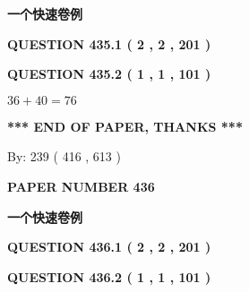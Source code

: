 \documentclass{ctexart}
\begin{document}
   
   
   
 \vspace{0.2in}
{\LARGE {\textbf{ 一个快速卷例}}}
   
   
  
\vspace{0.2in}
  
{\textbf{\Large{QUESTION
435.1 
 ( 2 , 2 , 201 )
}}}
  
  
  
\vspace{0.2in}
  
{\textbf{\Large{QUESTION
435.2 
 ( 1 , 1 , 101 )
}}}
  
  
 
 

$ %
36 +  %
40=   %
76$
 
 
   
   
 \vspace{0.2in}
 
   
   
   
   
\vspace{1.0in} 
{\textbf{\large{ *** END OF PAPER, THANKS *** }}} 
   
   
\hspace{1.0in} By: 
 239 ( 416 ,  613 )
   
   
   
   
\newpage 
\setcounter{page}{ 
   436001 } 
   
   
   
   
 {\textbf{ \Large{ PAPER NUMBER  436  }}}
   
   
\vspace{0.2in}
   
   
   
   
   
   
 \vspace{0.2in}
{\LARGE {\textbf{ 一个快速卷例}}}
   
   
  
\vspace{0.2in}
  
{\textbf{\Large{QUESTION
436.1 
 ( 2 , 2 , 201 )
}}}
  
  
  
\vspace{0.2in}
  
{\textbf{\Large{QUESTION
436.2 
 ( 1 , 1 , 101 )
}}}
  
  
 
\end{document}
